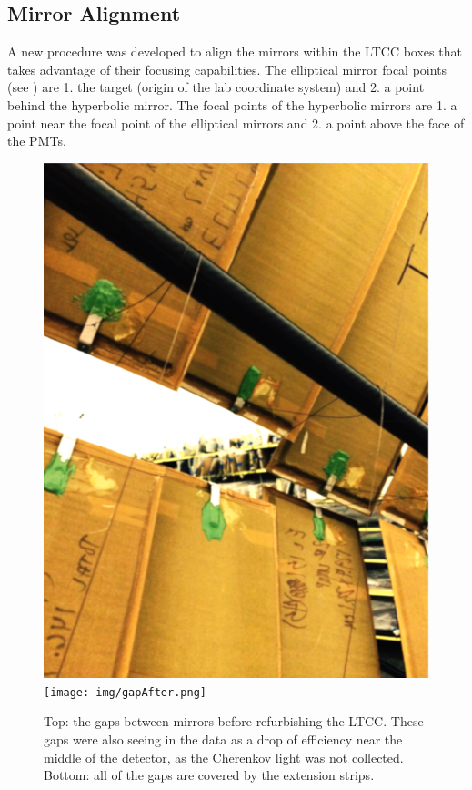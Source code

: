 \subsection{Mirror Alignment}
\label{sec:mirrorAlignment}

A new procedure was developed to align the mirrors within the LTCC boxes that takes advantage of their focusing
capabilities. The elliptical mirror focal points (see ) are 1. the target (origin of the lab
coordinate system) and 2. a point behind the hyperbolic mirror. The focal points of the hyperbolic mirrors are 1. a
point near the focal point of the elliptical mirrors and 2. a point above the face of the PMTs.

\begin{figure}[hb]
\centering
	\includegraphics[width=0.98\columnwidth, height=0.7\columnwidth]{img/gapBefore.png}
	\texttt{[image: img/gapAfter.png]}
	\caption{Top: the gaps between mirrors before refurbishing the LTCC. These gaps were also seeing in the data
          as a drop of efficiency near the middle of the detector, as the Cherenkov light was not collected. Bottom: all of
          the gaps are covered by the extension strips.}
	\label{fig:gapBeforeAndAfter}
\end{figure}

